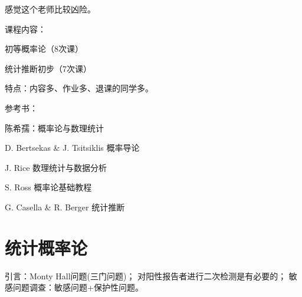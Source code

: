 \def\coursename{概率论}
\def\coursefullname{概率论、数理统计和随机过程初步}
\def\courseEnglishname{Probability and Statistics}
\def\teachername{唐宏岩老师、续本达}
\def\beginday{2022/9/13}




\usepackage{ulem}

\renewcommand*{\c}{^\mathrm{c}}
\newcommand*{\cF}{\mathcal F}
\let\originP\P
\let\P\relax
\let\originE\E
\let\E\relax
\DeclareMathOperator{\P}{P}
\DeclareMathOperator{\E}{E}
\DeclareMathOperator{\Var}{Var}
\DeclareMathOperator{\SD}{SD}
\DeclareMathOperator{\Cov}{Cov}
\DeclareMathOperator{\Corr}{Corr}
\DeclareMathOperator{\CDF}{F}
\DeclareMathOperator{\MGF}{M}
\DeclareMathOperator{\CF}{\psi}

\DeclareMathOperator{\Bern}{B}
\DeclareMathOperator{\Pois}{\pi}
\DeclareMathOperator{\Unif}{U}
\DeclareMathOperator{\Norm}{N}
\DeclareMathOperator{\Expo}{Exp}
\newcommand*{\inv}{^{-1}}
\newcommand*{\dto}{\overset{\text{d}}\semilongrightarrow}
\newcommand*{\pto}{\overset\P\semilongrightarrow}
\newcommand*{\asto}{\overset{\text{a.}\,\text{s.}}\semilongrightarrow}
\newcommand*{\dotsim}{\overset\cdot\sim}

\makeindex[title=索引]


\firstandforemost

感觉这个老师比较凶险。

课程内容：
\begin{compactenum}
	\item 初等概率论（8次课）
	\item 统计推断初步（7次课）
\end{compactenum}

特点：内容多、作业多、退课的同学多。

参考书：
\begin{compactitem}
	\item 陈希孺：概率论与数理统计
	\item D. Bertsekas \& J. Tsitsiklis 概率导论
	\item J. Rice 数理统计与数据分析
	\item S. Ross 概率论基础教程
	\item G. Casella \& R. Berger 统计推断
\end{compactitem}

\clearpage
\part{统计概率论}

引言：Monty Hall问题(三门问题)；%
对阳性报告者进行二次检测是有必要的；	
敏感问题调查：敏感问题+保护性问题。
	
